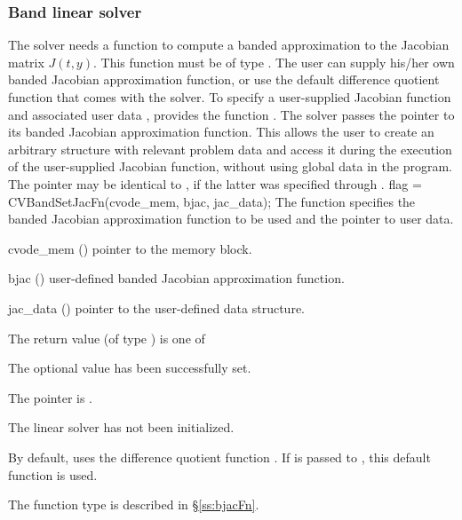 \subsubsection{Band linear solver}\label{sss:optin_band}
The 
{\cvband} solver needs a function to compute a banded approximation to
the Jacobian matrix $J(t,y)$.  This function must be of type . 
The user can supply his/her own banded Jacobian approximation function, 
or use the default difference quotient function  
that comes with the {\cvband} solver.
To specify a user-supplied Jacobian function  and associated user 
data , {\cvband} provides the function .
The {\cvband} solver passes the pointer 
to its banded Jacobian approximation function. This allows the user to
create an arbitrary structure with relevant problem data and access it
during the execution of the user-supplied Jacobian function, without
using global data in the program.  The pointer  may be
identical to , if the latter was specified through .
{
  flag = CVBandSetJacFn(cvode\_mem, bjac, jac\_data);
}
{
  The function  specifies the banded Jacobian
  approximation function to be used and the pointer to user data.
}
{
  \begin{args}
  \item[cvode\_mem] ()
    pointer to the {\cvodes} memory block.
  \item[bjac] ()
    user-defined banded Jacobian approximation function.
  \item[jac\_data] ()
    pointer to the user-defined data structure.
  \end{args}
}
{
  The return value  (of type ) is one of
  \begin{args}
  \item[\Id{CVBAND\_SUCCESS}] 
    The optional value has been successfully set.
  \item[\Id{CVBAND\_MEM\_NULL}]
    The  pointer is .
  \item[\Id{CVBAND\_LMEM\_NULL}]
    The {\cvband} linear solver has not been initialized.
  \end{args}
}
{
  By default, {\cvband} uses the difference quotient function .
  If  is passed to , this default function is used.

  The function type  is described in \S\ref{ss:bjacFn}.
}

